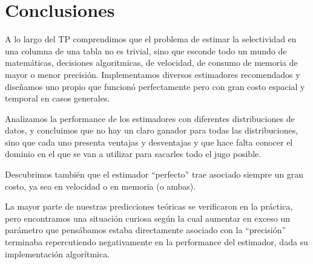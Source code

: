 \section{Conclusiones}
A lo largo del TP comprendimos que el problema de estimar la selectividad en una columna de una tabla no es trivial, sino que esconde todo un mundo de matemáticas, decisiones algoritmicas, de velocidad, de consumo de memoria de mayor o menor precisión. Implementamos diversos estimadores recomendados y diseñamos uno propio que funcionó perfectamente pero con gran costo espacial y temporal en casos generales.

Analizamos la performance de los estimadores con diferentes distribuciones de datos, y concluimos que no hay un claro ganador para todas las distribuciones, sino que cada uno presenta ventajas y desventajas y que hace falta conocer el dominio en el que se van a utilizar para sacarles todo el jugo posible.

Descubrimos también que el estimador ``perfecto'' trae asociado siempre un gran costo, ya sea en velocidad o en memoria (o ambas).

La mayor parte de nuestras predicciones teóricas se verificaron en la práctica, pero encontramos una situación curiosa según la cual aumentar en exceso un parámetro que pensábamos estaba directamente asociado con la ``precisión'' terminaba repercutiendo negativamente en la performance del estimador, dada su implementación algorítmica.

